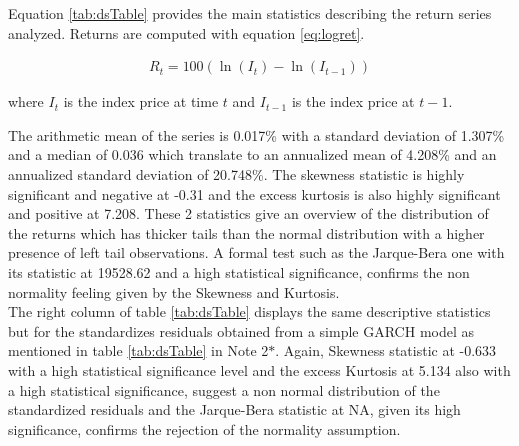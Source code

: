 \documentclass[a4paper, twoside]{templates/ociamthesis}
\begin{document}
Equation \ref{tab:dsTable} provides the main statistics describing the return series analyzed. Returns are computed with equation \eqref{eq:logret}.

\begin{align}
R_{t}=100\left(\ln \left(I_{t}\right)-\ln \left(I_{t-1}\right)\right)
  \label{eq:logret}
\end{align}

\noindent where \(I_{t}\) is the index price at time \(t\) and \(I_{t-1}\) is the index price at \(t-1\).

\noindent The arithmetic mean of the series is 0.017\% with a standard deviation of 1.307\% and a median of 0.036 which translate to an annualized mean of 4.208\% and an annualized standard deviation of 20.748\%. The skewness statistic is highly significant and negative at -0.31 and the excess kurtosis is also highly significant and positive at 7.208. These 2 statistics give an overview of the distribution of the returns which has thicker tails than the normal distribution with a higher presence of left tail observations. A formal test such as the Jarque-Bera one with its statistic at 19528.62 and a high statistical significance, confirms the non normality feeling given by the Skewness and Kurtosis. ~\\

\noindent The right column of table \ref{tab:dsTable} displays the same descriptive statistics but for the standardizes residuals obtained from a simple GARCH model as mentioned in table \ref{tab:dsTable} in Note 2\(*\). Again, Skewness statistic at -0.633 with a high statistical significance level and the excess Kurtosis at 5.134 also with a high statistical significance, suggest a non normal distribution of the standardized residuals and the Jarque-Bera statistic at NA, given its high significance, confirms the rejection of the normality assumption.
\end{document}
